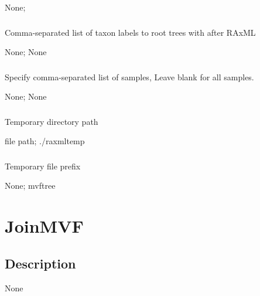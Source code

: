 \documentclass[letterpaper,11pt,english]{sphinxmanual}
\begin{document}
 None; 


\subsubsection{}
\label{\detokenize{prog_desc:root-with-rootwith}}
 Comma-separated list of taxon labels to root trees with after RAxML

 None;  None


\subsubsection{}
\label{\detokenize{prog_desc:id107}}
 Specify comma-separated list of samples, Leave blank for all samples.

 None;  None


\subsubsection{}
\label{\detokenize{prog_desc:tempdir}}
 Temporary directory path

 file path;  ./raxmltemp


\subsubsection{}
\label{\detokenize{prog_desc:tempprefix}}
 Temporary file prefix

 None;  mvftree


\section{JoinMVF}
\label{\detokenize{prog_desc:joinmvf}}

\subsection{Description}
\label{\detokenize{prog_desc:id108}}
None
\end{document}
